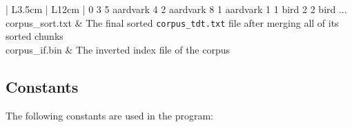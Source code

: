 \documentclass[11pt]{article}
\begin{document}
\begin{table}[!ht]
\begin{center}
\begin{tabular}{| L{3.5cm} | L{12cm} |}
{        0 3 5 aardvark  4 2 aardvark  8 1 aardvark  1 1 bird  2 2 bird \newline
        ...}
        \\ \hline
        corpus\_sort.txt & The final sorted \texttt{corpus\_tdt.txt} file after merging all of its sorted chunks
        \\ \hline
        corpus\_if.bin & The inverted index file of the corpus
        \\ \hline
        \end{tabular}

    \end{center}

\end{table}

\subsection{Constants}
The following constants are used in the program:
\end{document}
